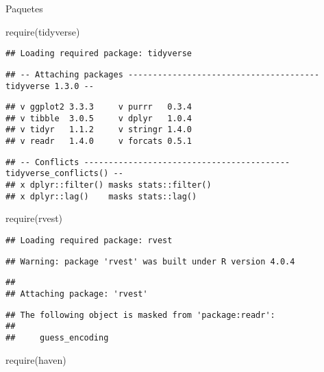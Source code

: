 \documentclass[
]{article}
\newenvironment{Shaded}{\begin{snugshade}}{\end{snugshade}}
\newcommand{\FunctionTok}[1]{\textcolor[rgb]{0.00,0.00,0.00}{#1}}
\newcommand{\NormalTok}[1]{#1}
\begin{document}
Paquetes

\begin{Shaded}
\begin{Highlighting}[]
\FunctionTok{require}\NormalTok{(tidyverse)}
\end{Highlighting}
\end{Shaded}

\begin{verbatim}
## Loading required package: tidyverse
\end{verbatim}

\begin{verbatim}
## -- Attaching packages --------------------------------------- tidyverse 1.3.0 --
\end{verbatim}

\begin{verbatim}
## v ggplot2 3.3.3     v purrr   0.3.4
## v tibble  3.0.5     v dplyr   1.0.4
## v tidyr   1.1.2     v stringr 1.4.0
## v readr   1.4.0     v forcats 0.5.1
\end{verbatim}

\begin{verbatim}
## -- Conflicts ------------------------------------------ tidyverse_conflicts() --
## x dplyr::filter() masks stats::filter()
## x dplyr::lag()    masks stats::lag()
\end{verbatim}

\begin{Shaded}
\begin{Highlighting}[]
\FunctionTok{require}\NormalTok{(rvest)}
\end{Highlighting}
\end{Shaded}

\begin{verbatim}
## Loading required package: rvest
\end{verbatim}

\begin{verbatim}
## Warning: package 'rvest' was built under R version 4.0.4
\end{verbatim}

\begin{verbatim}
## 
## Attaching package: 'rvest'
\end{verbatim}

\begin{verbatim}
## The following object is masked from 'package:readr':
## 
##     guess_encoding
\end{verbatim}

\begin{Shaded}
\begin{Highlighting}[]
\FunctionTok{require}\NormalTok{(haven)}
\end{Highlighting}
\end{Shaded}
\end{document}
